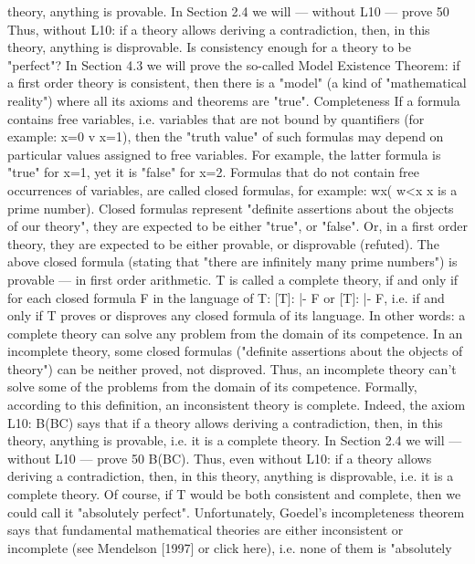 theory, anything is provable. In Section 2.4 we will --- without L10 --- prove 50%
Thus, without L10: if a theory allows deriving a contradiction, then, in this theory, anything is
disprovable.
Is consistency enough for a theory to be "perfect"? In Section 4.3 we will prove the so-called Model
Existence Theorem: if a first order theory is consistent, then there is a "model" (a kind of "mathematical
reality") where all its axioms and theorems are "true".
Completeness
If a formula contains free variables, i.e. variables that are not bound by quantifiers (for example: x=0 v
x=1), then the "truth value" of such formulas may depend on particular values assigned to free variables.
For example, the latter formula is "true" for x=1, yet it is "false" for x=2. Formulas that do not contain
free occurrences of variables, are called closed formulas, for example:
\forall w\exists x( w<x \AND  x is a prime number).
Closed formulas represent "definite assertions about the objects of our theory", they are expected to be
either "true", or "false". Or, in a first order theory, they are expected to be either provable, or disprovable
(refuted). The above closed formula (stating that "there are infinitely many prime numbers") is provable ---
in first order arithmetic.
T is called a complete theory, if and only if for each closed formula F in the language of T: [T]: |- F or
[T]: |- \neg F, i.e. if and only if T proves or disproves any closed formula of its language. In other words: a
complete theory can solve any problem from the domain of its competence.
In an incomplete theory, some closed formulas ("definite assertions about the objects of theory") can be
neither proved, not disproved. Thus, an incomplete theory can't solve some of the problems from the
domain of its competence.
Formally, according to this definition, an inconsistent theory is complete. Indeed, the axiom L10:
\neg B\IMPLIES (B\IMPLIES C) says that if a theory allows deriving a contradiction, then, in this theory, anything is
provable, i.e. it is a complete theory. In Section 2.4 we will --- without L10 --- prove 50%
\neg B\IMPLIES (B\IMPLIES \neg C). Thus, even without L10: if a theory allows deriving a contradiction, then, in this theory,
anything is disprovable, i.e. it is a complete theory.
Of course, if T would be both consistent and complete, then we could call it "absolutely perfect".
Unfortunately, Goedel's incompleteness theorem says that fundamental mathematical theories are
either inconsistent or incomplete (see Mendelson [1997] or click here), i.e. none of them is "absolutely
